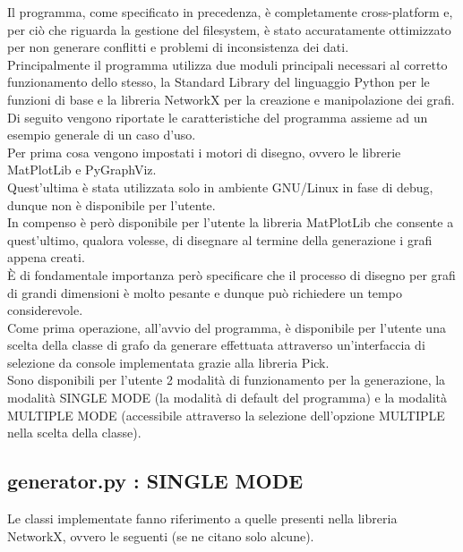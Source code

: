 Il programma, come specificato in precedenza, è completamente cross-platform e, per ciò che riguarda la gestione del filesystem, è stato accuratamente ottimizzato per non generare conflitti e problemi di inconsistenza dei dati.\\

Principalmente il programma utilizza due moduli principali necessari al corretto funzionamento dello stesso, la Standard Library del linguaggio Python per le funzioni di base e la libreria NetworkX per la creazione e manipolazione dei grafi.\\

Di seguito vengono riportate le caratteristiche del programma assieme ad un esempio generale di un caso d'uso.\\

Per prima cosa vengono impostati i motori di disegno, ovvero le librerie MatPlotLib e PyGraphViz.\\
Quest'ultima è stata utilizzata solo in ambiente GNU/Linux in fase di debug, dunque non è disponibile per l'utente.\\

In compenso è però disponibile per l'utente la libreria MatPlotLib che consente a quest'ultimo, qualora volesse, di disegnare al termine della generazione i grafi appena creati.\\
È di fondamentale importanza però specificare che il processo di disegno per grafi di grandi dimensioni è molto pesante e dunque può richiedere un tempo considerevole.\\

Come prima operazione, all'avvio del programma, è disponibile per l'utente una scelta della classe di grafo da generare effettuata attraverso un'interfaccia di selezione da console implementata grazie alla libreria Pick.\\

Sono disponibili per l'utente 2 modalità di funzionamento per la generazione, la modalità SINGLE MODE (la modalità di default del programma) e la modalità MULTIPLE MODE (accessibile attraverso la selezione dell'opzione MULTIPLE nella scelta della classe).\\

\subsection{generator.py : SINGLE MODE}
\justify
Le classi implementate fanno riferimento a quelle presenti nella libreria NetworkX, ovvero le seguenti (se ne citano solo alcune).

